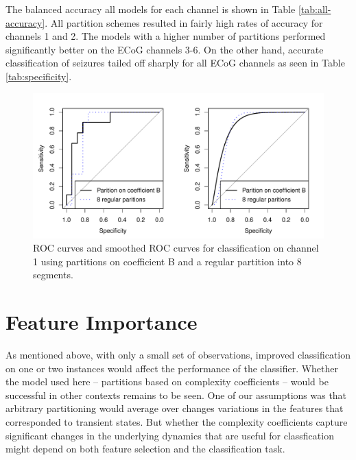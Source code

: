 The balanced accuracy all models for each channel is shown in Table \ref{tab:all-accuracy}. All partition
schemes resulted in fairly high rates of accuracy for channels 1 and 2. The models with a higher number of 
partitions performed significantly better on the 
ECoG channels 3-6. On the other hand, accurate classification of seizures tailed off sharply for all ECoG channels as seen in Table \ref{tab:specificity}. 

\begin{figure}[!htbp]
  \begin{center}
  \includegraphics[width = \textwidth, keepaspectratio]{./figs/eegroc-comb.pdf}
  \end{center}
  \caption{ROC curves and smoothed ROC curves
           for classification on channel 1 using 
           partitions on coefficient B and a regular partition into 
           8 segments.}
\end{figure}
\label{fig:eegroc} 
\section{Feature Importance}

As mentioned above, with only a small set of observations, 
improved classification on one or two instances
would affect the performance of the classifier.
Whether the model used here --
partitions based on complexity coefficients -- would be successful in other contexts remains to be seen. 
One of our assumptions was that arbitrary partitioning would average over changes variations in the features that corresponded to transient states. 
But whether the complexity coefficients capture significant
changes in the underlying dynamics that are useful for classfication might depend on both feature selection and the classification task. 

